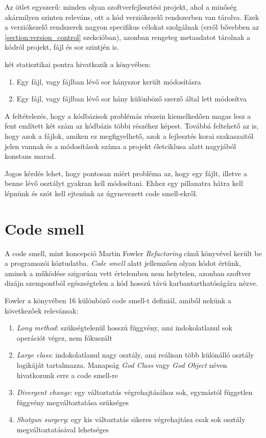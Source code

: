 Az ötlet egyszerű: minden olyan szoftverfejlesztési projekt, ahol a minőség akármilyen szinten releváns, ott a kód verziókezelő rendszerben van tárolva. Ezek a verziókezelő rendszerek nagyon specifikus célokat szolgálnak (erről bővebben az \ref{section:version_control} szekcióban), azonban rengeteg metaadatot tárolnak a kódról projekt, fájl és sor szintjén is.

\citeauthor{tornhillXrays} két statisztikai pontra hivatkozik a könyvében:
\begin{enumerate}
    \item Egy fájl, vagy fájlban lévő sor hányszor került módosításra
    \item Egy fájl, vagy fájlban lévő sor hány különböző szerző által lett módosítva
\end{enumerate}

A feltételezés, hogy a kódbázisok problémás részein kiemelkedően magas lesz a fent említett két szám az kódbázis többi részéhez képest. Továbbá feltehető az is, hogy azok a fájlok, amiken ez megfigyelhető, azok a fejlesztés korai szakaszaitól jelen vannak és a módosítások száma a projekt életciklusa alatt nagyjából konstans marad.

Jogos kérdés lehet, hogy pontosan miért probléma az, hogy egy fájlt, illetve a benne lévő osztályt gyakran kell módosítani. Ehhez egy pillanatra hátra kell lépnünk és szót kell ejtenünk az úgynevezett code smell-ekről.

\section{Code smell}

A code smell, mint koncepció Martin Fowler \textit{Refactoring}\cite{fowlerRefactoring} című könyvével került be a programozói köztudatba. \textit{Code smell} alatt jellemzően olyan kódot értünk, aminek a működése szigorúan vett értelemben nem helytelen, azonban szoftver dizájn szempontból egészségtelen a kód hosszú távú karbantarthatóságára nézve.

Fowler a könyvében 16 különböző code smell-t definiál, amiből nekünk a következőek relevánsak:
\begin{enumerate}
    \item \textit{Long method}: szükségtelenül hosszú függvény, ami indokolatlanul sok operációt végez, nem fókuszált
    \item \textit{Large class}: indokolatlanul nagy osztály, ami reálisan több különálló osztály logikáját tartalmazza. Manapság \textit{God Class} vagy \textit{God Object} néven hivatkozunk erre a code smell-re
    \item \textit{Divergent change}: egy változtatás végrehajtásához sok, egymástól független függvény megváltoztatása szükséges
    \item \textit{Shotgun surgery}: egy kis változtatás sikeres végrehajtása csak sok osztály megváltoztatásával lehetséges
\end{enumerate}

